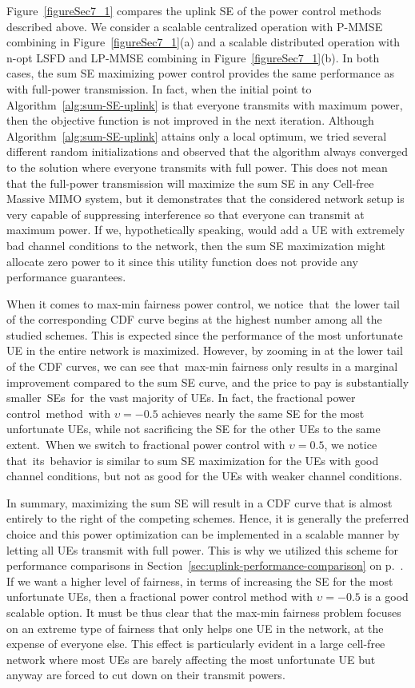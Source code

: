 Figure~\ref{figureSec7_1} compares the uplink SE of the power control methods described above. We consider a scalable centralized operation with P-MMSE combining in Figure~\ref{figureSec7_1}(a) and a scalable distributed operation with n-opt LSFD and LP-MMSE combining in Figure~\ref{figureSec7_1}(b). In both cases, the sum SE maximizing power control provides the same performance as with full-power transmission. In fact, when the initial point to Algorithm~\ref{alg:sum-SE-uplink} is that everyone transmits with maximum power, then the objective function is not improved in the next iteration. Although Algorithm~\ref{alg:sum-SE-uplink} attains only a local optimum, we tried several different random initializations and observed that the algorithm always converged to the solution where everyone transmits with full power. 
This does not mean that the full-power transmission will maximize the sum SE in any Cell-free Massive MIMO system, but it demonstrates that the considered network setup is very capable of suppressing interference so that everyone can transmit at maximum power. If we, hypothetically speaking, would add a UE with extremely bad channel conditions to the network, then the sum SE maximization might allocate zero power to it since this utility function does not provide any performance guarantees.

When it comes to max-min fairness power control, we notice~that~the lower tail of the corresponding CDF curve begins at the highest number among all the studied schemes. This is expected since the performance of the most unfortunate UE in the entire network is maximized. However, by zooming in at the lower tail of the CDF curves, we can see that~max-min fairness only results in a marginal improvement compared to the sum SE curve, and the price to pay is substantially smaller~SEs~for~the vast majority of UEs.
In fact, the fractional power control~method~with $\upsilon=-0.5$ achieves nearly the same SE for the most unfortunate UEs, while not sacrificing the SE for the other UEs to the same extent.~When we switch to fractional power control with $\upsilon=0.5$, we notice that~its~behavior is similar to sum SE maximization for the UEs with good channel conditions, but not as good for the UEs with weaker channel conditions.

In summary, maximizing the sum SE will result in a CDF curve that is almost entirely to the right of the competing schemes. Hence, it is generally the preferred choice and this power optimization can be implemented in a scalable manner by letting all UEs transmit with full power. This is why we utilized this scheme for performance comparisons in Section~\ref{sec:uplink-performance-comparison} on p.~\pageref{sec:uplink-performance-comparison}.
If we want a higher level of fairness, in terms of increasing the SE for the most unfortunate UEs, then a fractional power control method with $\upsilon=-0.5$ is a good scalable option. It must be thus clear that the max-min fairness problem focuses on an extreme type of fairness that only helps one UE in the network, at the expense of everyone else. This effect is particularly evident in a large cell-free network where most UEs are barely affecting the most unfortunate UE but anyway are forced to cut down on their transmit powers.



